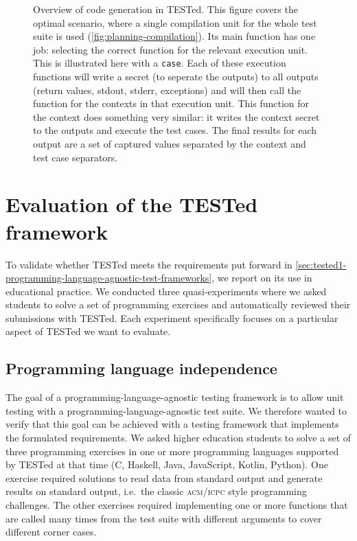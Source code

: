 \documentclass[../main]{subfiles}
\begin{document}
\begin{figure}
    \centering
    
    \caption{Overview of code generation in TESTed.
        This figure covers the optimal scenario, where a single compilation unit for the whole test suite is used (\cref{fig:planning-compilation}).
        Its main function has one job: selecting the correct function for the relevant execution unit.
        This is illustrated here with a \texttt{case}.
        Each of these execution functions will write a secret (to seperate the outputs) to all outputs (return values, stdout, stderr, exceptions) and will then call the function for the contexts in that execution unit.
        This function for the context does something very similar: it writes the context secret to the outputs and execute the test cases.
        The final results for each output are a set of captured values separated by the context and test case separators.
    }
    \label{fig:generated-code}
\end{figure}

\section{Evaluation of the TESTed framework}\label{sec:tested1-evaluating-tested}

To validate whether TESTed meets the requirements put forward in \cref{sec:tested1-programming-language-agnostic-test-frameworks}, we report on its use in educational practice.
We conducted three quasi-experiments where we asked students to solve a set of programming exercises and automatically reviewed their submissions with TESTed.
Each experiment specifically focuses on a particular aspect of TESTed we want to evaluate.

\subsection{Programming language independence}\label{subsec:programming-language-independence}

The goal of a programming-language-agnostic testing framework is to allow unit testing with a programming-language-agnostic test suite.
We therefore wanted to verify that this goal can be achieved with a testing framework that implements the formulated requirements.
We asked higher education students to solve a set of three programming exercises in one or more programming languages supported by TESTed at that time (C, Haskell, Java, JavaScript, Kotlin, Python).
One exercise required solutions to read data from standard output and generate results on standard output, i.e.\ the classic \textsc{acm/icpc} style programming challenges.
The other exercises required implementing one or more functions that are called many times from the test suite with different arguments to cover different corner cases.
\end{document}
